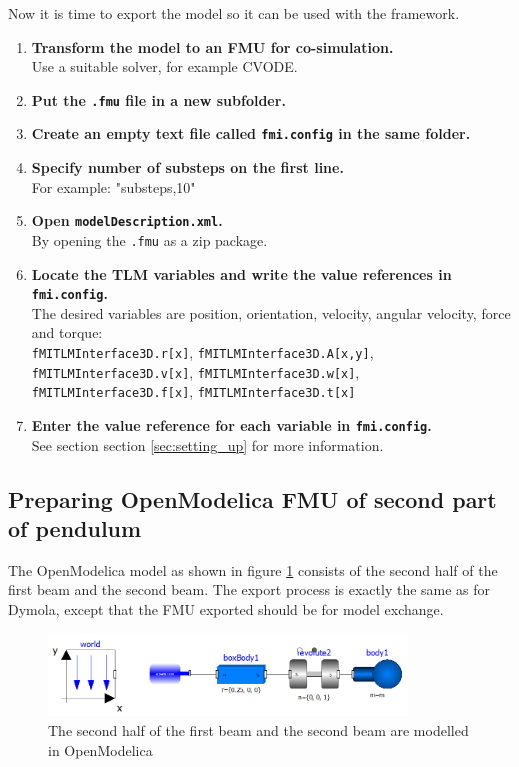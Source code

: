 Now it is time to export the model so it can be used with the framework.
\begin{enumerate}
\item \textbf{Transform the model to an FMU for co-simulation.}\\
      Use a suitable solver, for example CVODE.
\item \textbf{Put the \texttt{.fmu} file in a new subfolder.}
\item \textbf{Create an empty text file called \texttt{fmi.config} in the same folder.}
\item \textbf{Specify number of substeps on the first line.}\\
              For example: "substeps,10"
\item \textbf{Open \texttt{modelDescription.xml}.}\\
              By opening the \texttt{.fmu} as a zip package.
\item \textbf{Locate the TLM variables and write the value references in \texttt{fmi.config}.}\\
              The desired variables are position, orientation, velocity, angular velocity, force and torque:\\
              \texttt{fMITLMInterface3D.r[x]}, \texttt{fMITLMInterface3D.A[x,y]},\\
              \texttt{fMITLMInterface3D.v[x]}, \texttt{fMITLMInterface3D.w[x]},\\
              \texttt{fMITLMInterface3D.f[x]}, \texttt{fMITLMInterface3D.t[x]}
\item \textbf{Enter the value reference for each variable in \texttt{fmi.config}.}\\
              See section section \ref{sec:setting_up} for more information.              
\end{enumerate}

\subsection{Preparing OpenModelica FMU of second part of pendulum}
The OpenModelica model as shown in figure \ref{fig:model_omedit} consists of the second half of the first beam and the second beam.
The export process is exactly the same as for Dymola, except that the FMU exported should be for model exchange.

\begin{figure}[ht]
\centering
\includegraphics[width=0.85\textwidth]{figs/model_omedit.png}
\caption{The second half of the first beam and the second beam  are modelled in OpenModelica}
\label{fig:model_omedit}
\end{figure}

